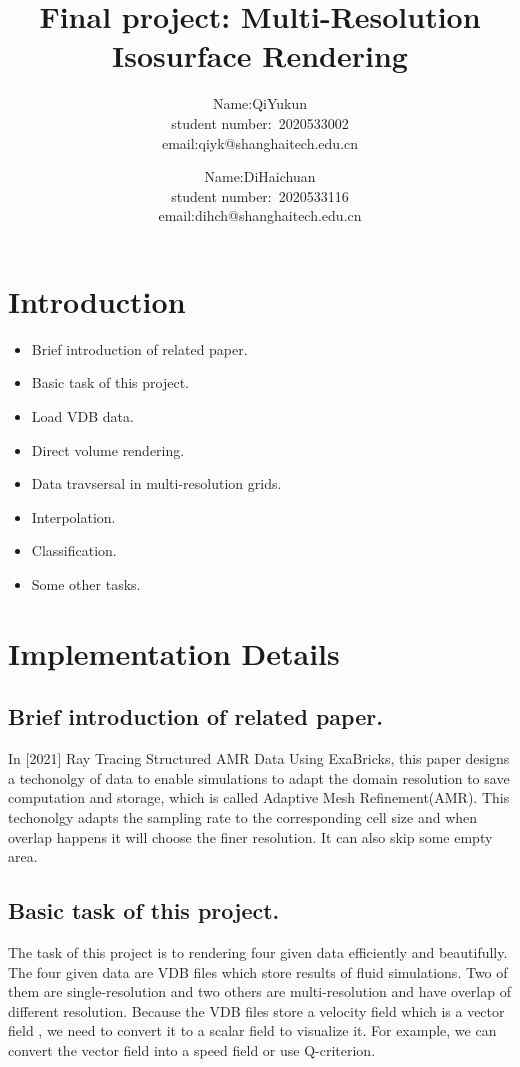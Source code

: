 \documentclass[acmtog]{acmart}
\title{Final project: {Multi-Resolution Isosurface Rendering}}
\author{Name:\quad QiYukun  \\ student number:\ 2020533002
	\\email:\quad qiyk@shanghaitech.edu.cn\\}
\author{Name:\quad DiHaichuan  \\ student number:\ 2020533116
	\\email:\quad dihch@shanghaitech.edu.cn}
\begin{document}
	\maketitle
	
	\vspace*{2 ex}
	
	\section{Introduction}
	\begin{itemize}
		\item Brief introduction of related paper.
		\item Basic task of this project.
		\item Load VDB data.
		\item Direct volume rendering.
		\item Data travsersal in multi-resolution grids.
		\item Interpolation.
		\item Classification.
		\item Some other tasks.
	\end{itemize}
	\section{Implementation Details}
	\subsection{Brief introduction of related paper.}
	In [2021] Ray Tracing Structured AMR Data Using ExaBricks, this paper designs a techonolgy of data to enable simulations to adapt the domain resolution to save computation and storage, which is called Adaptive Mesh Refinement(AMR). This techonolgy adapts the sampling rate to the corresponding cell size and when overlap happens it will choose the finer resolution. It can also skip some empty area.
	\subsection{Basic task of this project.}
	The task of this project is to rendering four given data efficiently and beautifully. The four given data are VDB files which store results of fluid simulations. Two of them are single-resolution and two others are multi-resolution and have overlap of different resolution. Because the VDB files store a velocity field which is a vector field , we need to convert it to a scalar field to visualize it. For example, we can convert the vector field into a speed field or use Q-criterion.
\end{document}
